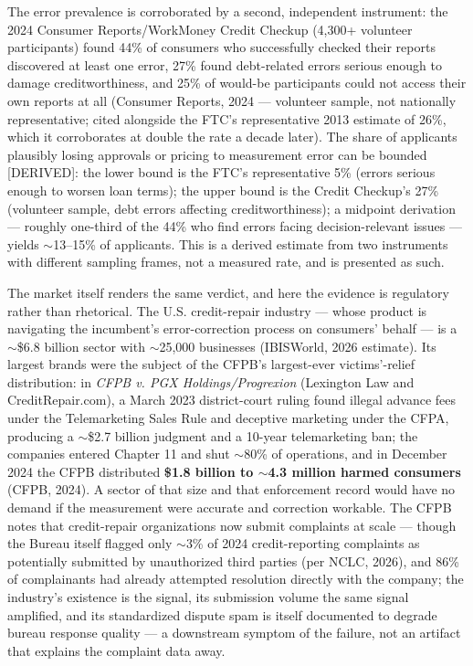 \documentclass[11pt,twocolumn]{article}
\begin{document}
The error prevalence is corroborated by a second, independent instrument: the 2024 Consumer Reports/WorkMoney Credit Checkup (4,300+ volunteer participants) found 44\% of consumers who successfully checked their reports discovered at least one error, 27\% found debt-related errors serious enough to damage creditworthiness, and 25\% of would-be participants could not access their own reports at all (Consumer Reports, 2024 --- volunteer sample, not nationally representative; cited alongside the FTC's representative 2013 estimate of 26\%, which it corroborates at double the rate a decade later). The share of applicants plausibly losing approvals or pricing to measurement error can be bounded [DERIVED]: the lower bound is the FTC's representative 5\% (errors serious enough to worsen loan terms); the upper bound is the Credit Checkup's 27\% (volunteer sample, debt errors affecting creditworthiness); a midpoint derivation --- roughly one-third of the 44\% who find errors facing decision-relevant issues --- yields $\sim$13--15\% of applicants. This is a derived estimate from two instruments with different sampling frames, not a measured rate, and is presented as such.

The market itself renders the same verdict, and here the evidence is regulatory rather than rhetorical. The U.S. credit-repair industry --- whose product is navigating the incumbent's error-correction process on consumers' behalf --- is a $\sim$\$6.8 billion sector with $\sim$25,000 businesses (IBISWorld, 2026 estimate). Its largest brands were the subject of the CFPB's largest-ever victims'-relief distribution: in \emph{CFPB v. PGX Holdings/Progrexion} (Lexington Law and CreditRepair.com), a March 2023 district-court ruling found illegal advance fees under the Telemarketing Sales Rule and deceptive marketing under the CFPA, producing a $\sim$\$2.7 billion judgment and a 10-year telemarketing ban; the companies entered Chapter 11 and shut $\sim$80\% of operations, and in December 2024 the CFPB distributed \textbf{\$1.8 billion to $\sim$4.3 million harmed consumers} (CFPB, 2024). A sector of that size and that enforcement record would have no demand if the measurement were accurate and correction workable. The CFPB notes that credit-repair organizations now submit complaints at scale --- though the Bureau itself flagged only $\sim$3\% of 2024 credit-reporting complaints as potentially submitted by unauthorized third parties (per NCLC, 2026), and 86\% of complainants had already attempted resolution directly with the company; the industry's existence is the signal, its submission volume the same signal amplified, and its standardized dispute spam is itself documented to degrade bureau response quality --- a downstream symptom of the failure, not an artifact that explains the complaint data away.
\end{document}
